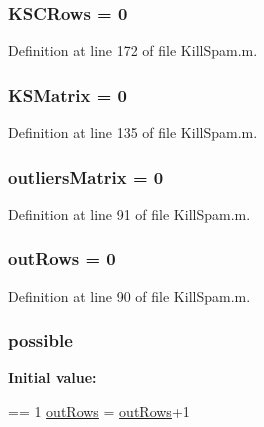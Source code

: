 \hypertarget{a00029_a56aa0b3ac00410dc36f9043c641ae205}{
\subsubsection[{K\+S\+C\+Rows}]{\setlength{\rightskip}{0pt plus 5cm}K\+S\+C\+Rows = 0}}\label{a00029_a56aa0b3ac00410dc36f9043c641ae205}


Definition at line 172 of file Kill\+Spam.\+m.

\hypertarget{a00029_aea43faf8d3d68de03c645edc96b0c1c0}{
\subsubsection[{K\+S\+Matrix}]{\setlength{\rightskip}{0pt plus 5cm}K\+S\+Matrix = 0}}\label{a00029_aea43faf8d3d68de03c645edc96b0c1c0}


Definition at line 135 of file Kill\+Spam.\+m.

\hypertarget{a00029_ad8a18b407726bf44299c9bcf5d1389ff}{
\subsubsection[{outliers\+Matrix}]{\setlength{\rightskip}{0pt plus 5cm}outliers\+Matrix = 0}}\label{a00029_ad8a18b407726bf44299c9bcf5d1389ff}


Definition at line 91 of file Kill\+Spam.\+m.

\hypertarget{a00029_a60cfb1ca20cbbc81b85a8f56658b7c99}{
\subsubsection[{out\+Rows}]{\setlength{\rightskip}{0pt plus 5cm}out\+Rows = 0}}\label{a00029_a60cfb1ca20cbbc81b85a8f56658b7c99}


Definition at line 90 of file Kill\+Spam.\+m.

\hypertarget{a00029_a07c9e68cdbafe572c04d3112d64deb88}{
\subsubsection[{possible}]{ possible}}\label{a00029_a07c9e68cdbafe572c04d3112d64deb88}
{\bfseries Initial value\+:}
\begin{DoxyCode}
== 1
            \hyperlink{a00029_a60cfb1ca20cbbc81b85a8f56658b7c99}{outRows} = \hyperlink{a00029_a60cfb1ca20cbbc81b85a8f56658b7c99}{outRows}+1
\end{DoxyCode}


